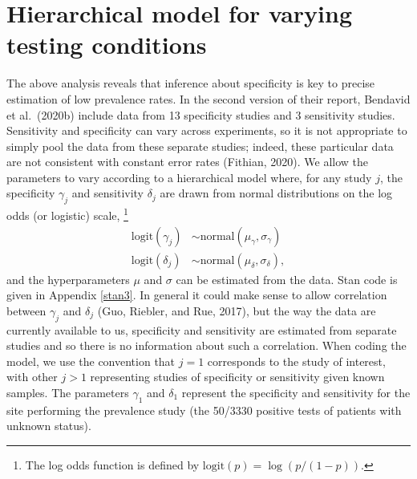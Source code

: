 \documentclass[11pt]{article}
\begin{document}
\section{Hierarchical model for varying testing conditions}\label{model2}

The above analysis reveals that inference about specificity is key to
precise estimation of low prevalence rates.  In the second version of
their report, Bendavid et al.\ (2020b) include data from 13
specificity studies and 3 sensitivity studies.  Sensitivity and
specificity can vary across experiments, so it is not appropriate to
simply pool the data from these separate studies; indeed, these
particular data are not consistent with constant error rates (Fithian,
2020). We allow the parameters to vary according to a hierarchical
model where, for any study $j$, the specificity $\gamma_j$ and
sensitivity $\delta_j$ are drawn from normal distributions on the
log odds (or logistic) scale,%
%
\footnote{The log odds function is defined by $\textrm{logit}(p) = \log(p / (1 - p)).$}
%
\begin{align*}
  \mbox{logit}(\gamma_j) & \sim \mbox{normal}(\mu_{\gamma}, \sigma_{\gamma})\\
 \mbox{logit}(\delta_j) & \sim \mbox{normal}(\mu_{\delta}, \sigma_{\delta}),
\end{align*}
%
and the hyperparameters $\mu$ and $\sigma$ can be estimated from the
data.  Stan code is given in Appendix \ref{stan3}.  In general it
could make sense to allow correlation between $\gamma_j$ and
$\delta_j$ (Guo, Riebler, and Rue, 2017), but the way the data are
currently available to us, specificity and sensitivity are estimated
from separate studies and so there is no information about such a
correlation.  When coding the model, we use the convention that $j=1$
corresponds to the study of interest, with other $j > 1$ representing
studies of specificity or sensitivity given known samples.  The
parameters $\gamma_1$ and $\delta_1$ represent the specificity and
sensitivity for the site performing the prevalence study (the 50/3330
positive tests of patients with unknown status).
\end{document}
